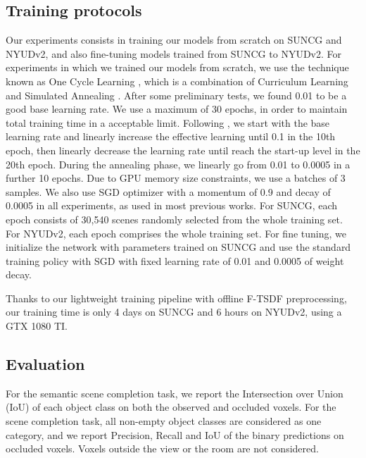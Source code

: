 \subsection{Training protocols}
Our experiments consists in training our models from scratch on SUNCG and NYUDv2, and also fine-tuning models trained from SUNCG to NYUDv2. 
For experiments in which we trained our models from scratch, we use the technique known as One Cycle Learning \cite{Smith_2018}, which is a combination of Curriculum Learning \cite{Bengio_2009} and  Simulated Annealing \cite{Aarts:1989:SAB:61990}. After some preliminary tests, we found 0.01 to be a good base learning rate.  We use a maximum of 30 epochs, in order to maintain total training time in a acceptable limit. Following \cite{Smith_2018}, we start with the base learning rate and linearly increase the effective learning until 0.1 in the 10th epoch, then  linearly decrease the learning rate until reach the start-up level in the 20th epoch. During the annealing phase, we linearly go from 0.01 to 0.0005 in a further 10 epochs.
Due to GPU memory size constraints, we use a batches of 3 samples. We also use SGD optimizer with a momentum of 0.9 and decay of 0.0005 in all experiments, as used in most previous works. For SUNCG, each epoch consists of 30,540 scenes randomly selected from the whole training set. For NYUDv2, each epoch comprises the whole training set. 
For fine tuning, we initialize the network with parameters trained on SUNCG and use the standard training policy with SGD with fixed learning rate of 0.01 and 0.0005 of weight decay. 

Thanks to our lightweight training pipeline with offline F-TSDF preprocessing, our training time is only 4 days on SUNCG and 6 hours on NYUDv2, using a GTX 1080 TI.



\subsection{Evaluation}

For the semantic scene completion task, we report the Intersection over Union (IoU) of each object class on both the observed and occluded voxels. For the scene completion task, all non-empty object classes are considered as one category, and we report Precision, Recall and IoU of the binary predictions on occluded voxels. Voxels outside the view or the room are not considered. 



\begingroup
\setlength{\tabcolsep}{2pt} \renewcommand{\arraystretch}{1} 

